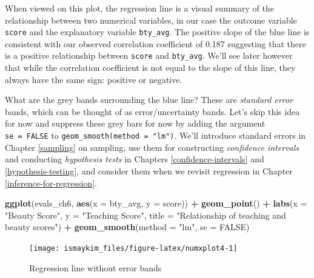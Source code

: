 \documentclass[12pt,]{krantz}
\makeatletter
\newenvironment{Shaded}{\begin{snugshade}}{\end{snugshade}}
\newcommand{\KeywordTok}[1]{\textcolor[rgb]{0.27,0.27,0.27}{\textbf{#1}}}
\newcommand{\DataTypeTok}[1]{\textcolor[rgb]{0.27,0.27,0.27}{#1}}
\newcommand{\StringTok}[1]{\textcolor[rgb]{0.5,0.5,0.5}{#1}}
\newcommand{\OtherTok}[1]{\textcolor[rgb]{0.37,0.37,0.37}{#1}}
\newcommand{\OperatorTok}[1]{\textcolor[rgb]{0.43,0.43,0.43}{\textbf{#1}}}
\newcommand{\NormalTok}[1]{#1}
\newenvironment{kframe}{%
\medskip{}
\setlength{\fboxsep}{.8em}
 \def\at@end@of@kframe{}%
 \ifinner\ifhmode%
  \def\at@end@of@kframe{\end{minipage}}%
  \begin{minipage}{\columnwidth}%
 \fi\fi%
 \def\FrameCommand##1{\hskip\@totalleftmargin \hskip-\fboxsep
 \colorbox{shadecolor}{##1}\hskip-\fboxsep
     \hskip-\linewidth \hskip-\@totalleftmargin \hskip\columnwidth}%
 \MakeFramed {\advance\hsize-\width
   \@totalleftmargin\z@ \linewidth\hsize
   \@setminipage}}%
 {\par\unskip\endMakeFramed%
 \at@end@of@kframe}
\renewenvironment{Shaded}{\begin{kframe}}{\end{kframe}}
\makeatother
\begin{document}
When viewed on this plot, the regression line is a visual summary of the
relationship between two numerical variables, in our case the outcome
variable \texttt{score} and the explanatory variable \texttt{bty\_avg}.
The positive slope of the blue line is consistent with our observed
correlation coefficient of 0.187 suggesting that there is a positive
relationship between \texttt{score} and \texttt{bty\_avg}. We'll see
later however that while the correlation coefficient is not equal to the
slope of this line, they always have the same sign: positive or
negative.

What are the grey bands surrounding the blue line? These are
\emph{standard error} bands, which can be thought of as
error/uncertainty bands. Let's skip this idea for now and suppress these
grey bars for now by adding the argument \texttt{se\ =\ FALSE} to
\texttt{geom\_smooth(method\ =\ "lm")}. We'll introduce standard errors
in Chapter \ref{sampling} on sampling, use them for constructing
\emph{confidence intervals} and conducting \emph{hypothesis tests} in
Chapters \ref{confidence-intervals} and \ref{hypothesis-testing}, and
consider them when we revisit regression in Chapter
\ref{inference-for-regression}.

\begin{Shaded}
\begin{Highlighting}[]
\KeywordTok{ggplot}\NormalTok{(evals_ch6, }\KeywordTok{aes}\NormalTok{(}\DataTypeTok{x =}\NormalTok{ bty_avg, }\DataTypeTok{y =}\NormalTok{ score)) }\OperatorTok{+}
\StringTok{  }\KeywordTok{geom_point}\NormalTok{() }\OperatorTok{+}
\StringTok{  }\KeywordTok{labs}\NormalTok{(}\DataTypeTok{x =} \StringTok{"Beauty Score"}\NormalTok{, }\DataTypeTok{y =} \StringTok{"Teaching Score"}\NormalTok{, }
       \DataTypeTok{title =} \StringTok{"Relationship of teaching and beauty scores"}\NormalTok{) }\OperatorTok{+}
\StringTok{  }\KeywordTok{geom_smooth}\NormalTok{(}\DataTypeTok{method =} \StringTok{"lm"}\NormalTok{, }\DataTypeTok{se =} \OtherTok{FALSE}\NormalTok{)}
\end{Highlighting}
\end{Shaded}

\begin{figure}

{\centering \texttt{[image: ismaykim\_files/figure-latex/numxplot4-1]} 

}

\caption{Regression line without error bands}\label{fig:numxplot4}
\end{figure}
\end{document}
